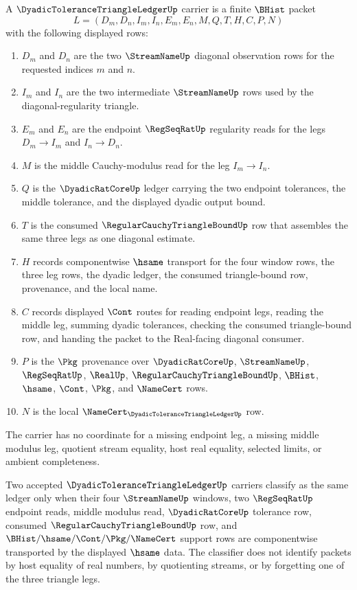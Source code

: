 \begin{definition}
\label{def:dyadic-tolerance-triangle-ledger-carrier}
A $\DyadicToleranceTriangleLedgerUp$ carrier is a finite $\BHist$ packet
$$
L=(D_m,D_n,I_m,I_n,E_m,E_n,M,Q,T,H,C,P,N)
$$
with the following displayed rows:
\begin{enumerate}
\item $D_m$ and $D_n$ are the two $\StreamNameUp$ diagonal observation rows for the requested indices $m$ and $n$.
\item $I_m$ and $I_n$ are the two intermediate $\StreamNameUp$ rows used by the diagonal-regularity triangle.
\item $E_m$ and $E_n$ are the endpoint $\RegSeqRatUp$ regularity reads for the legs $D_m \longrightarrow I_m$ and $I_n \longrightarrow D_n$.
\item $M$ is the middle Cauchy-modulus read for the leg $I_m \longrightarrow I_n$.
\item $Q$ is the $\DyadicRatCoreUp$ ledger carrying the two endpoint tolerances, the middle tolerance, and the displayed dyadic output bound.
\item $T$ is the consumed $\RegularCauchyTriangleBoundUp$ row that assembles the same three legs as one diagonal estimate.
\item $H$ records componentwise $\hsame$ transport for the four window rows, the three leg rows, the dyadic ledger, the consumed triangle-bound row, provenance, and the local name.
\item $C$ records displayed $\Cont$ routes for reading endpoint legs, reading the middle leg, summing dyadic tolerances, checking the consumed triangle-bound row, and handing the packet to the Real-facing diagonal consumer.
\item $P$ is the $\Pkg$ provenance over $\DyadicRatCoreUp$, $\StreamNameUp$, $\RegSeqRatUp$, $\RealUp$, $\RegularCauchyTriangleBoundUp$, $\BHist$, $\hsame$, $\Cont$, $\Pkg$, and $\NameCert$ rows.
\item $N$ is the local $\NameCert_{\DyadicToleranceTriangleLedgerUp}$ row.
\end{enumerate}
The carrier has no coordinate for a missing endpoint leg, a missing middle modulus leg, quotient stream equality, host real equality, selected limits, or ambient completeness.
\end{definition}

\begin{definition}
\label{def:dyadic-tolerance-triangle-ledger-classifier}
Two accepted $\DyadicToleranceTriangleLedgerUp$ carriers classify as the same ledger only when their four $\StreamNameUp$ windows, two $\RegSeqRatUp$ endpoint reads, middle modulus read, $\DyadicRatCoreUp$ tolerance row, consumed $\RegularCauchyTriangleBoundUp$ row, and $\BHist/\hsame/\Cont/\Pkg/\NameCert$ support rows are componentwise transported by the displayed $\hsame$ data. The classifier does not identify packets by host equality of real numbers, by quotienting streams, or by forgetting one of the three triangle legs.
\end{definition}

